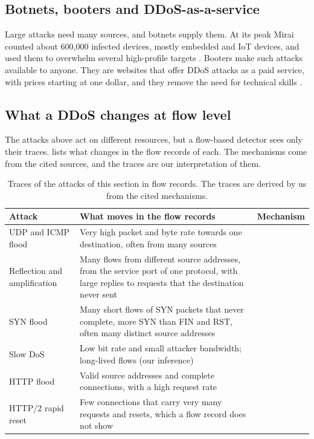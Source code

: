 \subsection{Botnets, booters and DDoS-as-a-service}
\label{sec:botnets-booters}

Large attacks need many sources, and botnets supply them. At its peak Mirai
counted about 600{,}000 infected devices, mostly embedded and IoT devices, and
used them to overwhelm several high-profile targets
\citep{antonakakis2017mirai}. Booters make such attacks available to anyone.
They are websites that offer DDoS attacks as a paid service, with prices
starting at one dollar, and they remove the need for technical skills
\citep{santanna2015inside}.

\subsection{What a DDoS changes at flow level}
\label{sec:flow-signatures}

The attacks above act on different resources, but a flow-based detector sees
only their traces.  lists what changes in the
flow records of each. The mechanisms come from the cited sources, and the
traces are our interpretation of them.

\begin{table}[t]
\centering
\small
\caption{Traces of the attacks of this section in flow records. The traces
are derived by us from the cited mechanisms.}
\label{tab:ddos-flow-signatures}
\begin{tabular}{@{}p{2.8cm}p{6.5cm}p{2.9cm}@{}}
\toprule
Attack & What moves in the flow records & Mechanism \\
\midrule
UDP and ICMP flood & Very high packet and byte rate towards one destination,
  often from many sources
  & \citep{handley2006rfc4732,mirkovic2004taxonomy} \\
Reflection and amplification & Many flows from different source addresses,
  from the service port of one protocol, with large replies to requests that
  the destination never sent
  & \citep{rossow2014amplification} \\
SYN flood & Many short flows of SYN packets that never complete, more SYN than
  FIN and RST, often many distinct source addresses
  & \citep{eddy2007rfc4987,wang2002detecting} \\
Slow DoS & Low bit rate and small attacker bandwidth; long-lived flows (our inference)
  & \citep{cambiaso2013slow} \\
HTTP flood & Valid source addresses and complete connections, with a high
  request rate
  & \citep{mirkovic2004taxonomy} \\
HTTP/2 rapid reset & Few connections that carry very many requests and
  resets, which a flow record does not show
  & \citep{thomson2022rfc9113,nvd2023rapidreset} \\
\bottomrule
\end{tabular}
\end{table}

